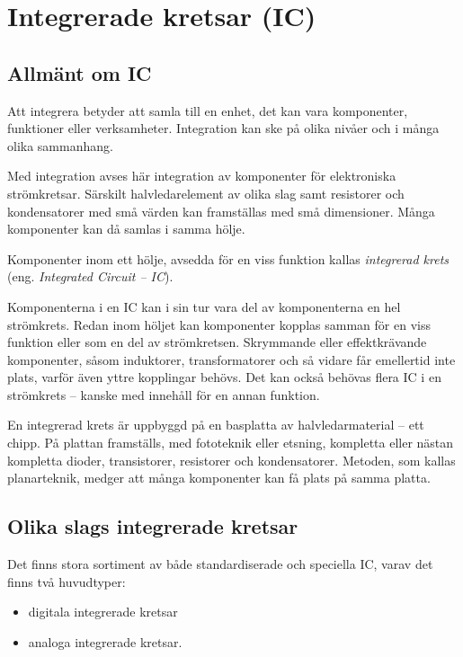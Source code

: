 \newpage
\section{Integrerade kretsar (IC)}
\label{integrerade kretsar}

\subsection{Allmänt om IC}

Att integrera betyder att samla till en enhet, det kan vara komponenter,
funktioner eller verksamheter.
Integration kan ske på olika nivåer och i många olika sammanhang.

Med integration avses här integration av komponenter för elektroniska
strömkretsar.
Särskilt halvledarelement av olika slag samt resistorer och kondensatorer med
små värden kan framställas med små dimensioner.
Många komponenter kan då samlas i samma hölje.

Komponenter inom ett hölje, avsedda för en viss funktion kallas
\emph{integrerad krets} (eng. \emph{Integrated Circuit -- IC}).

Komponenterna i en IC kan i sin tur vara del av komponenterna en hel strömkrets.
Redan inom höljet kan komponenter kopplas samman för en viss funktion eller som
en del av strömkretsen.
Skrymmande eller effektkrävande komponenter, såsom induktorer, transformatorer
och så vidare får emellertid inte plats, varför även yttre kopplingar behövs.
Det kan också behövas flera IC i en strömkrets -- kanske med innehåll för en
annan funktion.

En integrerad krets är uppbyggd på en basplatta av halvledarmaterial -- ett
chipp.
På plattan framställs, med fototeknik eller etsning, kompletta eller nästan
kompletta dioder, transistorer, resistorer och kondensatorer.
Metoden, som kallas planarteknik, medger att många komponenter kan få plats på
samma platta.

\subsection{Olika slags integrerade kretsar}

Det finns stora sortiment av både standardiserade och speciella IC, varav det
finns två huvudtyper:
\begin{itemize}
  \item digitala integrerade kretsar
  \item analoga integrerade kretsar.
\end{itemize}

